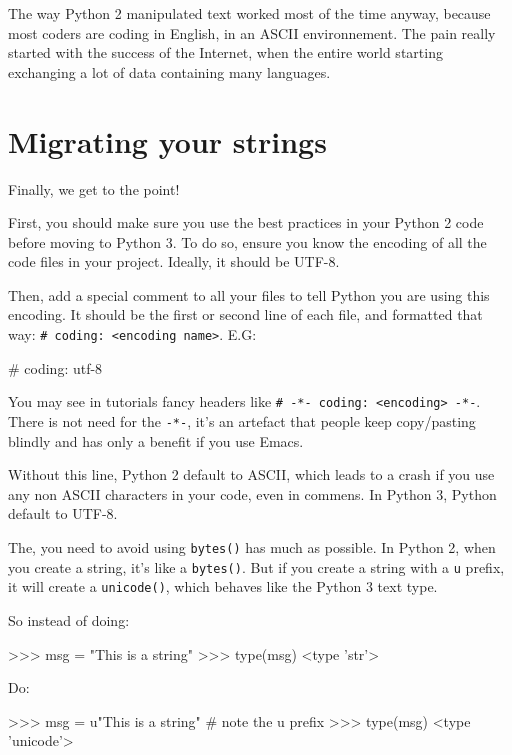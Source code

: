 The way Python 2 manipulated text worked most of the time anyway, because most coders are coding in English, in an ASCII environnement. The pain really started with the success of the Internet, when the entire world starting exchanging a lot of data containing many languages.

\section{Migrating your strings}

Finally, we get to the point!

First, you should make sure you use the best practices in your Python 2 code before moving to Python 3. To do so, ensure you know the encoding of all the code files in your project. Ideally, it should be UTF-8.

Then, add a special comment to all your files to tell Python you are using this encoding. It should be the first or second line of each file, and formatted that way: \lstinline{# coding: <encoding name>}. E.G:

\begin{py2and3}
# coding: utf-8
\end{py2and3}

You may see in tutorials fancy headers like \lstinline{# -*- coding: <encoding> -*-}. There is not need for the \lstinline{-*-}, it's an artefact that people keep copy/pasting blindly and has only a benefit if you use Emacs.

Without this line, Python 2 default to ASCII, which leads to a crash if you use any non ASCII characters in your code, even in commens. In Python 3, Python default to UTF-8.

The, you need to avoid using \lstinline{bytes()} has much as possible. In Python 2, when you create a string, it's like a \lstinline{bytes()}. But if you create a string with a \lstinline{u} prefix, it will create a \lstinline{unicode()}, which behaves like the Python 3 text type.

So instead of doing:

\begin{py2}
>>> msg = "This is a string"
>>> type(msg)
<type 'str'>
\end{py2}

Do:

\begin{py2}
>>> msg = u"This is a string" # note the u prefix
>>> type(msg)
<type 'unicode'>
\end{py2}

